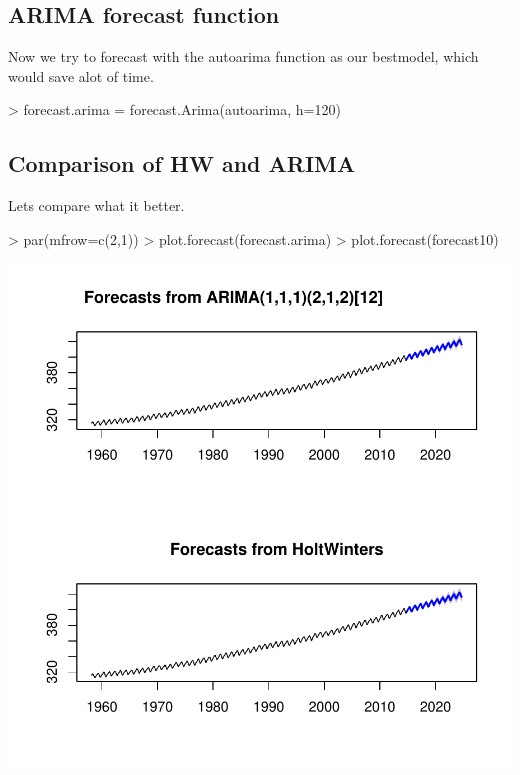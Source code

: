 \documentclass[11pt, a4paper]{article} %
\begin{document}
\subsection{ARIMA forecast function}
Now we try to forecast with the autoarima function as our bestmodel, which would save alot of time. 

\begin{Schunk}
\begin{Sinput}
> forecast.arima = forecast.Arima(autoarima, h=120) 
\end{Sinput}
\end{Schunk}

\subsection{Comparison of HW and ARIMA}
Lets compare what it better. 

\begin{Schunk}
\begin{Sinput}
> par(mfrow=c(2,1))
> plot.forecast(forecast.arima)
> plot.forecast(forecast10)
\end{Sinput}
\end{Schunk}
\includegraphics{alleselena-061}
\end{document}
